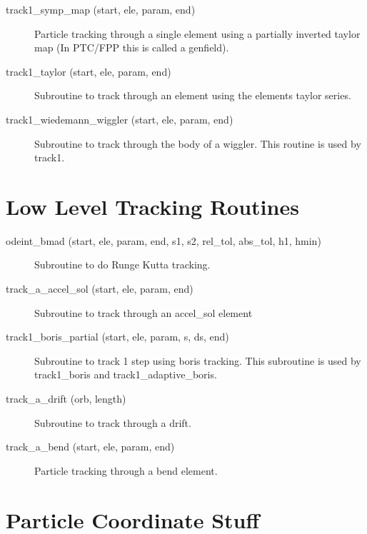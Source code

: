 \begin{description}
\item[track1\_symp\_map (start, ele, param, end)] \Newline
Particle tracking through a single element using a partially inverted 
taylor map (In PTC/FPP this is called a genfield). 

\item[track1\_taylor (start, ele, param, end)] \Newline
Subroutine to track through an element using the elements taylor series. 

\item[track1\_wiedemann\_wiggler (start, ele, param, end)] \Newline
Subroutine to track through the body of a wiggler. This routine is used by track1. 

\end{description}

\section{Low Level Tracking Routines}
\label{r:low_track}

\begin{description}

\item[odeint\_bmad (start, ele, param, end, s1, s2, rel\_tol, abs\_tol, h1, hmin)] \Newline
Subroutine to do Runge Kutta tracking. 

\item[track\_a\_accel\_sol (start, ele, param, end)] \Newline
Subroutine to track through an accel\_sol element 

\item[track1\_boris\_partial (start, ele, param, s, ds, end)] \Newline
Subroutine to track 1 step using boris tracking. 
This subroutine is used by track1\_boris and track1\_adaptive\_boris. 

\item[track\_a\_drift (orb, length)] \Newline
Subroutine to track through a drift. 

\item[track\_a\_bend (start, ele, param, end)] \Newline
Particle tracking through a bend element. 

\end{description}

\section{Particle Coordinate Stuff}
\label{r:coord}    

